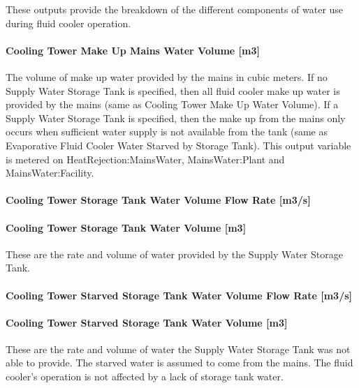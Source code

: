 These outputs provide the breakdown of the different components of water use during fluid cooler operation.

\paragraph{Cooling Tower Make Up Mains Water Volume {[}m3{]}}\label{cooling-tower-make-up-mains-water-volume-m3-4}

The volume of make up water provided by the mains in cubic meters. If no Supply Water Storage Tank is specified, then all fluid cooler make up water is provided by the mains (same as Cooling Tower Make Up Water Volume). If a Supply Water Storage Tank is specified, then the make up from the mains only occurs when sufficient water supply is not available from the tank (same as Evaporative Fluid Cooler Water Starved by Storage Tank). This output variable is metered on HeatRejection:MainsWater, MainsWater:Plant and MainsWater:Facility.

\paragraph{Cooling Tower Storage Tank Water Volume Flow Rate {[}m3/s{]}}\label{cooling-tower-storage-tank-water-volume-flow-rate-m3s-4}

\paragraph{Cooling Tower Storage Tank Water Volume {[}m3{]}}\label{cooling-tower-storage-tank-water-volume-m3-4}

These are the rate and volume of water provided by the Supply Water Storage Tank.

\paragraph{Cooling Tower Starved Storage Tank Water Volume Flow Rate {[}m3/s{]}}\label{cooling-tower-starved-storage-tank-water-volume-flow-rate-m3s-4}

\paragraph{Cooling Tower Starved Storage Tank Water Volume {[}m3{]}}\label{cooling-tower-starved-storage-tank-water-volume-m3-4}

These are the rate and volume of water the Supply Water Storage Tank was not able to provide. The starved water is assumed to come from the mains. The fluid cooler's operation is not affected by a lack of storage tank water.

